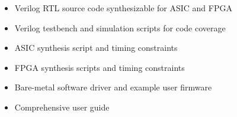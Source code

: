 %

\begin{itemize}
  \itemsep-0.5em
\item Verilog RTL source code synthesizable for ASIC and FPGA
\item Verilog testbench and simulation scripts for code coverage
\item ASIC synthesis script and timing constraints
\item FPGA synthesis scripts and timing constraints
\item Bare-metal software driver and example user firmware
\item Comprehensive user guide
\end{itemize}
